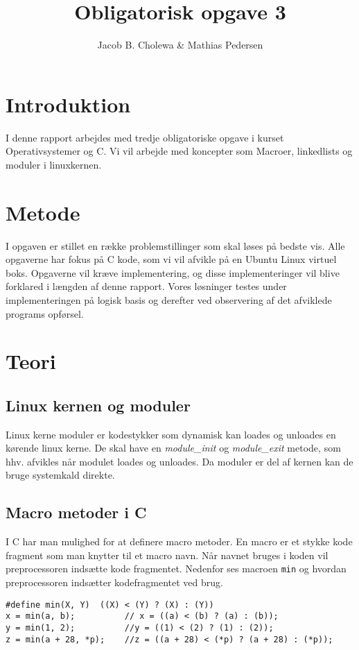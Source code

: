 \documentclass[danish]{report}
\title{Obligatorisk opgave 3}
\author{Jacob B. Cholewa \& Mathias Pedersen }
\begin{document}
\maketitle
\begingroup
\let\clearpage\relax
\chapter{Introduktion}
I denne rapport arbejdes med tredje obligatoriske opgave i kurset Operativsystemer og C. Vi vil arbejde med koncepter som Macroer, linkedlists og moduler i linuxkernen.

\vspace{20 mm}\chapter{Metode}
I opgaven er stillet en række problemstillinger som skal løses på bedste vis. Alle opgaverne har fokus på C kode, som vi vil afvikle på en Ubuntu Linux virtuel boks. Opgaverne vil kræve implementering, og disse implementeringer vil blive forklared i længden af denne rapport. Vores løsninger testes under implementeringen på logisk basis og derefter ved observering af det afviklede programs opførsel.
\endgroup
\chapter{Teori}
\section{Linux kernen og moduler}

Linux kerne moduler er kodestykker som dynamisk kan loades og unloades en kørende linux kerne. De skal have en \textit{module\_init} og \textit{module\_exit} metode, som hhv. afvikles når modulet loades og unloades. Da moduler er del af kernen kan de bruge systemkald direkte.

\section{Macro metoder i C}

I C har man mulighed for at definere macro metoder. En macro er et stykke kode fragment som man knytter til et macro navn. Når navnet bruges i koden vil preprocessoren indsætte kode fragmentet. Nedenfor ses macroen \texttt{min} og hvordan preprocessoren indsætter kodefragmentet ved brug.
\begin{lstlisting}
#define min(X, Y)  ((X) < (Y) ? (X) : (Y))
x = min(a, b);          // x = ((a) < (b) ? (a) : (b));
y = min(1, 2);          //y = ((1) < (2) ? (1) : (2));
z = min(a + 28, *p);    //z = ((a + 28) < (*p) ? (a + 28) : (*p));
\end{lstlisting}
\end{document}
